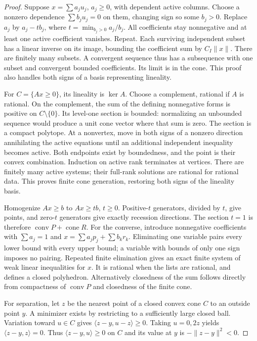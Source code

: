\documentclass[11pt]{article}
\theoremstyle{definition}\newtheorem{definition}[theorem]{Definition}
\theoremstyle{remark}\newtheorem{remark}[theorem]{Remark}
\newcommand{\conv}{\operatorname{conv}}\newcommand{\cone}{\operatorname{cone}}
\begin{document}
\begin{proof}
Suppose $x=\sum a_j u_j$, $a_j\geq0$, with dependent active columns. Choose a nonzero dependence $\sum b_j u_j=0$ on them, changing sign so some $b_j>0$. Replace $a_j$ by $a_j-tb_j$, where $t=\min_{b_j>0}a_j/b_j$. All coefficients stay nonnegative and at least one active coefficient vanishes. Repeat. Each surviving independent subset has a linear inverse on its image, bounding the coefficient sum by $C_I\|x\|$. There are finitely many subsets. A convergent sequence thus has a subsequence with one subset and convergent bounded coefficients. Its limit is in the cone. This proof also handles both signs of a basis representing lineality.

For $C=\{Ax\geq0\}$, its lineality is $\ker A$. Choose a complement, rational if $A$ is rational. On the complement, the sum of the defining nonnegative forms is positive on $C\setminus\{0\}$. Its level-one section is bounded: normalizing an unbounded sequence would produce a unit cone vector where that sum is zero. The section is a compact polytope. At a nonvertex, move in both signs of a nonzero direction annihilating the active equations until an additional independent inequality becomes active. Both endpoints exist by boundedness, and the point is their convex combination. Induction on active rank terminates at vertices. There are finitely many active systems; their full-rank solutions are rational for rational data. This proves finite cone generation, restoring both signs of the lineality basis.

Homogenize $Ax\geq b$ to $Ax\geq tb$, $t\geq0$. Positive-$t$ generators, divided by $t$, give points, and zero-$t$ generators give exactly recession directions. The section $t=1$ is therefore $\conv P+\cone R$. For the converse, introduce nonnegative coefficients with $\sum a_j=1$ and $x=\sum a_jp_j+\sum b_kr_k$. Eliminating one variable pairs every lower bound with every upper bound; a variable with bounds of only one sign imposes no pairing. Repeated finite elimination gives an exact finite system of weak linear inequalities for $x$. It is rational when the lists are rational, and defines a closed polyhedron. Alternatively closedness of the sum follows directly from compactness of $\conv P$ and closedness of the finite cone.

For separation, let $z$ be the nearest point of a closed convex cone $C$ to an outside point $y$. A minimizer exists by restricting to a sufficiently large closed ball. Variation toward $u\in C$ gives $\langle z-y,u-z\rangle\geq0$. Taking $u=0,2z$ yields $\langle z-y,z\rangle=0$. Thus $\langle z-y,u\rangle\geq0$ on $C$ and its value at $y$ is $-\|z-y\|^2<0$.
\end{proof}
\end{document}

